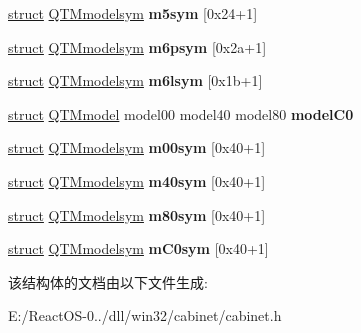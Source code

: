 \begin{DoxyCompactItemize}
\item 
\mbox{\label{struct_q_t_mstate_a5794d48a9aba966d1267eabff09ba5eb}} 
\hyperlink{interfacestruct}{struct} \hyperlink{struct_q_t_mmodelsym}{Q\+T\+Mmodelsym} {\bfseries m5sym} \mbox{[}0x24+1\mbox{]}
\item 
\mbox{\label{struct_q_t_mstate_abd3394387cd8ce140f5908cc1da093c2}} 
\hyperlink{interfacestruct}{struct} \hyperlink{struct_q_t_mmodelsym}{Q\+T\+Mmodelsym} {\bfseries m6psym} \mbox{[}0x2a+1\mbox{]}
\item 
\mbox{\label{struct_q_t_mstate_ad359f3e2437ce247f9265162c22112f1}} 
\hyperlink{interfacestruct}{struct} \hyperlink{struct_q_t_mmodelsym}{Q\+T\+Mmodelsym} {\bfseries m6lsym} \mbox{[}0x1b+1\mbox{]}
\item 
\mbox{\label{struct_q_t_mstate_a4594690bd37fef949e18348c98dc0d62}} 
\hyperlink{interfacestruct}{struct} \hyperlink{struct_q_t_mmodel}{Q\+T\+Mmodel} model00 model40 model80 {\bfseries model\+C0}
\item 
\mbox{\label{struct_q_t_mstate_ab3fc0009a7fb9fa60875416655ceb811}} 
\hyperlink{interfacestruct}{struct} \hyperlink{struct_q_t_mmodelsym}{Q\+T\+Mmodelsym} {\bfseries m00sym} \mbox{[}0x40+1\mbox{]}
\item 
\mbox{\label{struct_q_t_mstate_a287c12828a112c476de42b583feb3bd6}} 
\hyperlink{interfacestruct}{struct} \hyperlink{struct_q_t_mmodelsym}{Q\+T\+Mmodelsym} {\bfseries m40sym} \mbox{[}0x40+1\mbox{]}
\item 
\mbox{\label{struct_q_t_mstate_af702f62b48c7baca0a4554054053f2ff}} 
\hyperlink{interfacestruct}{struct} \hyperlink{struct_q_t_mmodelsym}{Q\+T\+Mmodelsym} {\bfseries m80sym} \mbox{[}0x40+1\mbox{]}
\item 
\mbox{\label{struct_q_t_mstate_a732b15939a3234b92a3c11ee95993859}} 
\hyperlink{interfacestruct}{struct} \hyperlink{struct_q_t_mmodelsym}{Q\+T\+Mmodelsym} {\bfseries m\+C0sym} \mbox{[}0x40+1\mbox{]}
\end{DoxyCompactItemize}


该结构体的文档由以下文件生成\+:\begin{DoxyCompactItemize}
\item 
E\+:/\+React\+O\+S-\/0../dll/win32/cabinet/cabinet.\+h\end{DoxyCompactItemize}
